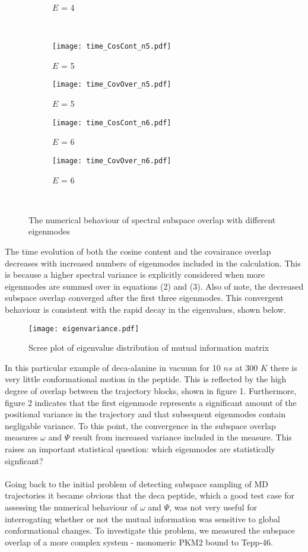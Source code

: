 \documentclass[11pt]{article}
\begin{document}
\begin{figure}[hbt]
\begin{subfigure}[b]{.24\linewidth}
    \caption{$E$ = 4}\label{fig:1h}
  \end{subfigure}\\%
  \begin{subfigure}[b]{.24\linewidth}
    \centering
    \texttt{[image: time\_CosCont\_n5.pdf]}
    \caption{$E$ = 5}\label{fig:1i}
  \end{subfigure}%
  \begin{subfigure}[b]{.24\linewidth}
    \centering
    \texttt{[image: time\_CovOver\_n5.pdf]}
    \caption{$E$ = 5}\label{fig:1j}
  \end{subfigure}%
  \begin{subfigure}[b]{.24\linewidth}
    \centering
    \texttt{[image: time\_CosCont\_n6.pdf]}
    \caption{$E$ = 6}\label{fig:1k}
  \end{subfigure}%
  \begin{subfigure}[b]{.24\linewidth}
    \centering
    \texttt{[image: time\_CovOver\_n6.pdf]}
    \caption{$E$ = 6}\label{fig:1l}
  \end{subfigure}\\%
\caption{The numerical behaviour of spectral subspace overlap with different eigenmodes}\label{fig:1}
\end{figure}
The time evolution of both the cosine content and the covairance overlap decreases with increased numbers of eigenmodes included in the calculation. This is because a higher spectral variance is explicitly considered when more eigenmodes are summed over in equations (2) and (3). Also of note, the decreased subspace overlap converged after the first three eigenmodes. This convergent behaviour is consistent with the rapid decay in the eigenvalues, shown below.
\begin{figure}[!ht]
\centering
\texttt{[image: eigenvariance.pdf]}
\caption{Scree plot of eigenvalue distribution of mutual information matrix}\label{fig:2} 
\end{figure}
In this particular example of deca-alanine in vacuum for 10 $ns$ at 300 $K$ there is very little conformational motion in the peptide. This is reflected by the high degree of overlap between the trajectory blocks, shown in figure 1. Furthermore, figure 2 indicates that the first eigenmode represents a significant amount of the positional variance in the trajectory and that subsequent eigenmodes contain negligable variance. To this point, the convergence in the subspace overlap measures $\omega$ and $\Psi$ result from increased variance included in the measure. This raises an important statistical question: which eigenmodes are statistically signficant?
\\
\\
Going back to the initial problem of detecting subspace sampling of MD trajectories it became obvious that the deca peptide, which a good test case for assessing the numerical behaviour of $\omega$ and $\Psi$, was not very useful for interrogating whether or not the mutual information was sensitive to global conformational changes. To investigate this problem, we measured the subspace overlap of a more complex system - monomeric PKM2 bound to Tepp-46.
\end{document}
